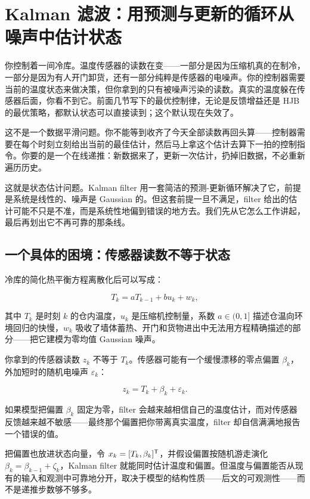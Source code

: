 \section{Kalman 滤波：用预测与更新的循环从噪声中估计状态}
\label{sec:16-Control-and-Reinforcement-Learning/01-Optimal-Control/04}

你控制着一间冷库。温度传感器的读数在变——一部分是因为压缩机真的在制冷，一部分是因为有人开门卸货，还有一部分纯粹是传感器的电噪声。你的控制器需要当前的温度状态来做决策，但你拿到的只有被噪声污染的读数。真实的温度躲在传感器后面，你看不到它。前面几节写下的最优控制律，无论是反馈增益还是 HJB 的最优策略，都默认状态可以直接读到；这个默认现在失效了。

这不是一个数据平滑问题。你不能等到收齐了今天全部读数再回头算——控制器需要在每个时刻立刻给出当前的最佳估计，然后马上拿这个估计去算下一拍的控制指令。你要的是一个在线递推：新数据来了，更新一次估计，扔掉旧数据，不必重新遍历历史。

这就是状态估计问题。Kalman filter 用一套简洁的预测-更新循环解决了它，前提是系统是线性的、噪声是 Gaussian 的。但这套前提一旦不满足，filter 给出的估计可能不只是不准，而是系统性地偏到错误的地方去。我们先从它怎么工作讲起，最后再划出它不再可靠的那条线。

\subsection{一个具体的困境：传感器读数不等于状态}

冷库的简化热平衡方程离散化后可以写成：

\[
T_k = a T_{k-1} + b u_k + w_k,
\]

其中 \(T_k\) 是时刻 \(k\) 的仓内温度，\(u_k\) 是压缩机控制量，系数 \(a\in(0,1]\) 描述仓温向环境回归的快慢，\(w_k\) 吸收了墙体蓄热、开门和货物进出中无法用方程精确描述的部分——把它建模为零均值 Gaussian 噪声。

你拿到的传感器读数 \(z_k\) 不等于 \(T_k\)。传感器可能有一个缓慢漂移的零点偏置 \(\beta_k\)，外加短时的随机电噪声 \(\varepsilon_k\)：

\[
z_k = T_k + \beta_k + \varepsilon_k.
\]

如果模型把偏置 \(\beta_k\) 固定为零，filter 会越来越相信自己的温度估计，而对传感器反馈越来越不敏感——最终那个偏置把你带离真实温度，filter 却自信满满地报告一个错误的值。

把偏置也放进状态向量，令 \(x_k = [T_k, \beta_k]^{\mathsf{T}}\)，并假设偏置按随机游走演化 \(\beta_k = \beta_{k-1} + \zeta_k\)，Kalman filter 就能同时估计温度和偏置。但温度与偏置能否从现有的输入和观测中可靠地分开，取决于模型的结构性质——后文的可观测性——而不是递推步数够不够多。

